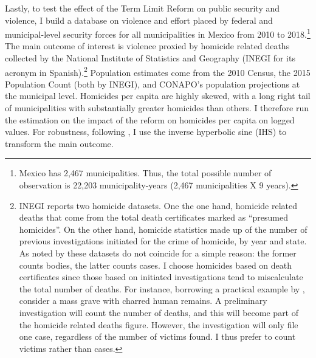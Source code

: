 \documentclass[12pt]{amsart}
\numberwithin{equation}{section}
\theoremstyle{definition}
\theoremstyle{definition}
\theoremstyle{definition}
\begin{document}
Lastly, to test the effect of the Term Limit Reform on public security and violence, I build a database on violence and effort placed by federal and municipal-level security forces for all municipalities in Mexico from 2010 to 2018.\footnote{Mexico has 2,467 municipalities. Thus, the total possible number of observation is 22,203 municipality-years (2,467 municipalities X 9 years).} The main outcome of interest is violence proxied by homicide related deaths collected by the National Institute of Statistics and Geography (INEGI for its acronym in Spanish).\footnote{INEGI reports two homicide datasets. One the one hand, homicide related deaths that come from the total death certificates marked as ``presumed homicides''. On the other hand, homicide statistics made up of the number of previous investigations initiated for the crime of homicide, by year and state. As noted by \citet{rivera_2012} these datasets do not coincide for a simple reason: the former counts bodies, the latter counts cases. I choose homicides based on death certificates since those based on initiated investigations tend to miscalculate the total number of deaths. For instance, borrowing a practical example by \citet{rivera_2012}, consider a mass grave with charred human remains. A preliminary investigation will count the number of deaths, and this will become part of the homicide related deaths figure. However, the investigation will only file one case, regardless of the number of victims found. I thus prefer to count victims rather than cases.} Population estimates come from the 2010 Census, the 2015 Population Count (both by INEGI), and CONAPO's population projections at the municipal level. Homicides per capita are highly skewed, with a long right tail of municipalities with substantially greater homicides than others. I therefore run the estimation on the impact of the reform on homicides per capita on logged values. For robustness, following \citet{mackinnon_maggie_1990}, I use the inverse hyperbolic sine (IHS) to transform the main outcome. %
\end{document}
